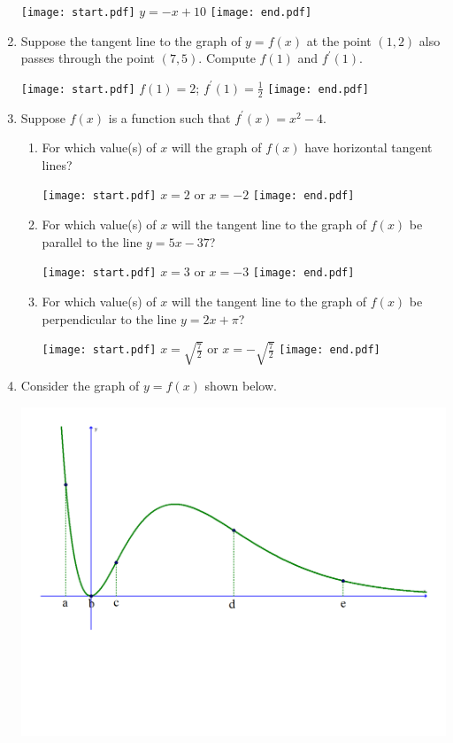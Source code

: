 \documentclass[12pt]{article}
\begin{document}
\begin{enumerate}
\texttt{[image: start.pdf]}
{{$y=-x+10$}}
\texttt{[image: end.pdf]}


\item Suppose the tangent line to the graph of $y=f(x)$ at the point $(1,2)$ also passes through the point $(7,5)$.  Compute $f(1)$ and $f^{\prime}(1)$.

\texttt{[image: start.pdf]}
{{$f(1)=2$; $\displaystyle f^{\prime}(1)=\frac{1}{2}$}}
\texttt{[image: end.pdf]}


\item Suppose $f(x)$ is a function such that $f^{\prime}(x)=x^2-4$.

\begin{enumerate}

\item For which value(s) of $x$ will the graph of $f(x)$ have horizontal tangent lines?

\texttt{[image: start.pdf]}
{{$x=2$ or $x=-2$}}
\texttt{[image: end.pdf]}


\item For which value(s) of $x$ will the tangent line to the graph of $f(x)$ be parallel to the line $y=5x-37$?

\texttt{[image: start.pdf]}
{{$x=3$ or $x=-3$}}
\texttt{[image: end.pdf]}


\item For which value(s) of $x$ will the tangent line to the graph of $f(x)$ be perpendicular to the line $y=2x+\pi$?

\texttt{[image: start.pdf]}
{{$\displaystyle x=\sqrt{\frac{7}{2}}$ or $\displaystyle x=-\sqrt{\frac{7}{2}}$}}
\texttt{[image: end.pdf]}


\end{enumerate}

\item Consider the graph of $y=f(x)$ shown below.\\
\begin{center}
\includegraphics[scale=0.45]{graph.pdf}
\end{center}


\end{enumerate}
\end{document}
